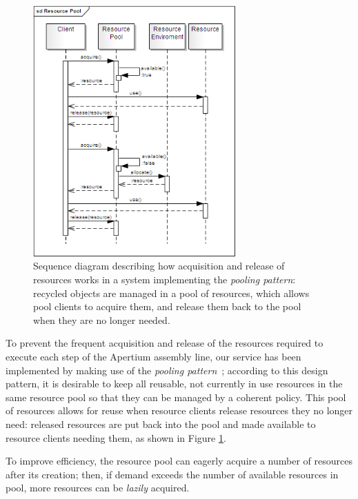\documentclass[11pt]{article}
\begin{document}
\begin{figure}[!ht]
\begin{center}
\includegraphics[width=7.75cm]{resource_pool}
\end{center}
\caption{Sequence diagram describing how acquisition and release of resources works in a system implementing the \emph{pooling pattern}: recycled objects are managed in a pool of resources, which allows pool clients to acquire them, and release them back to the pool when they are no longer needed.}
\label{fig:rp}
\end{figure}

To prevent the frequent acquisition and release of the resources required to execute each step of the Apertium assembly line, our service has been implemented by making use of the \emph{pooling pattern}~\citep{kircher2001}; according to this design pattern, it is desirable to keep all reusable, not currently in use resources in the same resource pool so that they can be managed by a coherent policy.
This pool of resources allows for reuse when resource clients release resources they no longer need: released resources are put back into the pool and made available to resource clients needing them, as shown in Figure \ref{fig:rp}.

To improve efficiency, the resource pool can eagerly acquire a number of resources after its creation; then, if demand exceeds the number of available resources in pool, more resources can be \emph{lazily} acquired.
\end{document}
